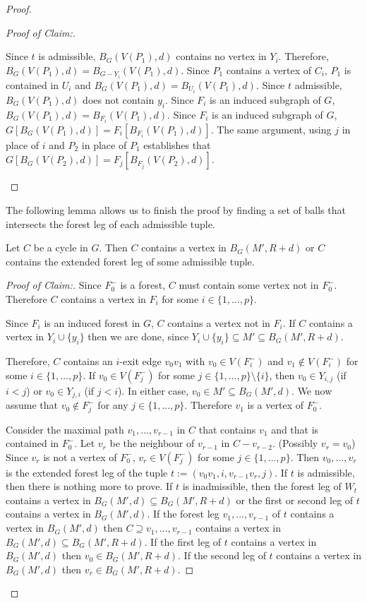 \documentclass{patmorin}
\newenvironment{clmproof}{\begin{proof}[Proof of Claim:]\renewcommand{\qedsymbol}{\rule{1ex}{1ex}}}{\end{proof}}
\begin{document}
\begin{proof}
\begin{clmproof}
\begin{compactenum}[(i)]
    \item Since $t$ is admissible, $B_G(V(P_1),d)$ contains no vertex in $Y_i$.  Therefore,
    $B_G(V(P_1),d)=B_{G-Y_i}(V(P_1),d)$. Since $P_1$ contains a vertex of $C_i$, $P_1$ is contained in $U_i$ and $B_G(V(P_1),d)=B_{U_i}(V(P_1),d)$.  Since $t$ admissible, $B_G(V(P_1),d)$ does not contain $y_i$.  Since $F_i$ is an induced subgraph of $G$, $B_G(V(P_1),d)=B_{F_i}(V(P_1),d)$.  Since $F_i$ is an induced subgraph of $G$, $G[B_G(V(P_1),d)]=F_i[B_{F_i}(V(P_1),d)]$.  The same argument, using $j$ in place of $i$ and $P_2$ in place of $P_1$ establishes that $G[B_G(V(P_2),d)]=F_j[B_{F_j}(V(P_2),d)]$. \qedhere
  \end{compactenum}
\end{clmproof}


The following lemma allows us to finish the proof by finding a set of balls that intersects the forest leg of each admissible tuple.

\begin{clm}\label{hit_cycle}
  Let $C$ be a cycle in $G$.  Then  $C$ contains a vertex in $B_G(M',R+d)$ or $C$ contains the extended forest leg of some admissible tuple.
\end{clm}

\begin{clmproof}
  Since $F_0^-$ is a forest, $C$ must contain some vertex not in $F_0^-$.  Therefore $C$ contains a vertex in $F_i$ for some $i\in\{1,\ldots,p\}$.

  Since $F_i$ is an induced forest in $G$, $C$ contains a vertex not in $F_i$. If $C$ contains a vertex in $Y_i\cup\{y_i\}$ then we are done, since $Y_i\cup\{y_i\}\subseteq M'\subseteq B_G(M',R+d)$.

  Therefore, $C$ contains an $i$-exit edge $v_0v_1$ with $v_0\in V(F^-_i)$ and $v_1\not\in V(F^-_i)$ for some $i\in\{1,\ldots,p\}$.  If $v_0\in V(F^-_j)$ for some $j\in\{1,\ldots,p\}\setminus\{i\}$, then $v_0\in Y_{i,j}$ (if $i< j$) or $v_0\in Y_{j,i}$ (if $j<i$).  In either case, $v_0\in M'\subseteq B_G(M',d)$.  We now assume that $v_0\notin F^-_j$ for any $j\in\{1,\ldots,p\}$.  Therefore $v_1$ is a vertex of $F_0^-$.

  Consider the maximal path $v_1,\ldots,v_{r-1}$ in $C$ that contains $v_1$ and that is contained in $F_0^-$. Let $v_r$ be the neighbour of $v_{r-1}$ in $C-v_{r-2}$.  (Possibly $v_r=v_0$)  Since $v_r$ is not a vertex of $F_0^-$, $v_r\in V(F^-_j)$ for some $j\in\{1,\ldots,p\}$.  Then $v_0,\ldots,v_{r}$ is the extended forest leg of the tuple $t:=(v_0v_1,i,v_{r-1}v_r,j)$.   If $t$ is admissible, then there is nothing more to prove.  If $t$ is inadmissible, then the forest leg of $W_t$ contains a vertex in $B_G(M',d)\subseteq B_G(M',R+d)$ or the first or second leg of $t$ contains a vertex in $B_G(M',d)$.  If the forest leg $v_1,\ldots,v_{r-1}$ of $t$ contains a vertex in $B_G(M',d)$ then $C\supseteq v_1,\ldots,v_{r-1}$ contains a vertex in $B_G(M',d)\subseteq B_G(M',R+d)$.  If the first leg of $t$ contains a vertex in $B_G(M',d)$ then $v_0\in B_G(M',R+d)$.  If the second leg of $t$ contains a vertex in $B_G(M',d)$ then $v_r\in B_G(M',R+d)$.
\end{clmproof}


\end{proof}
\end{document}
